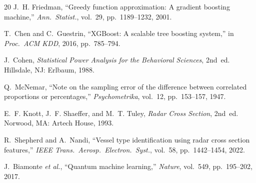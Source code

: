 \documentclass[journal]{IEEEtran}
\begin{document}
\begin{thebibliography}{20}
J.~H. Friedman, ``Greedy function approximation: A gradient boosting
machine,'' \emph{Ann.\ Statist.}, vol.~29, pp.~1189--1232, 2001.

T.~Chen and C.~Guestrin, ``XGBoost: A scalable tree boosting system,''
in \emph{Proc.\ ACM KDD}, 2016, pp.~785--794.

J.~Cohen, \emph{Statistical Power Analysis for the Behavioral Sciences},
2nd~ed. Hillsdale, NJ: Erlbaum, 1988.

Q.~McNemar, ``Note on the sampling error of the difference between
correlated proportions or percentages,'' \emph{Psychometrika}, vol.~12,
pp.~153--157, 1947.

E.~F. Knott, J.~F. Shaeffer, and M.~T. Tuley, \emph{Radar Cross
Section}, 2nd~ed. Norwood, MA: Artech House, 1993.

R.~Shepherd and A.~Nandi, ``Vessel type identification using radar
cross section features,'' \emph{IEEE Trans.\ Aerosp.\ Electron.\
Syst.}, vol.~58, pp.~1442--1454, 2022.

J.~Biamonte \emph{et al.}, ``Quantum machine learning,''
\emph{Nature}, vol.~549, pp.~195--202, 2017.

\end{thebibliography}
\end{document}
